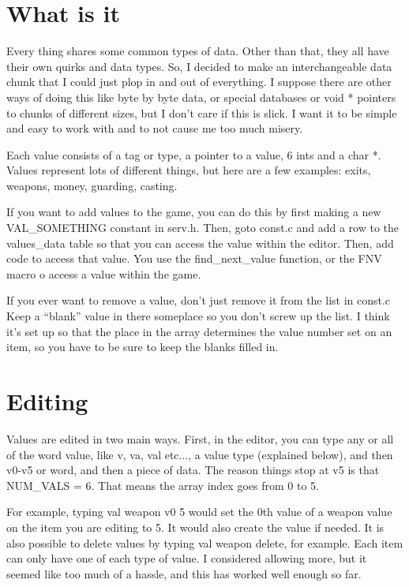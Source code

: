 \section{What is it}

Every thing shares some common types of data. Other than that, they
all have their own quirks and data types. So, I decided to make an
interchangeable data chunk that I could just plop in and out of
everything. I suppose there are other ways of doing this like byte by
byte data, or special databases or void * pointers to chunks of
different sizes, but I don't care if this is slick. I want it to be
simple and easy to work with and to not cause me too much misery.

Each value consists of a tag or type, a pointer to a value, 6 ints and
a char *. Values represent lots of different things, but here are a
few examples: exits, weapons, money, guarding, casting.

If you want to add values to the game, you can do this by first making
a new VAL\_SOMETHING constant in serv.h. Then, goto const.c and add a
row to the values\_data table so that you can access the value within
the editor. Then, add code to access that value. You use the
find\_next\_value function, or the FNV macro o access a value within
the game.

If you ever want to remove a value, don't just remove it from the list
in const.c Keep a ``blank'' value in there someplace so you don't
screw up the list. I think it's set up so that the place in the array
determines the value number set on an item, so you have to be sure to
keep the blanks filled in.


\section{Editing}

Values are edited in two main ways. First, in the editor, you can type
any or all of the word value, like v, va, val etc..., a value type
(explained below), and then v0-v5 or word, and then a piece of data.
The reason things stop at v5 is that NUM\_VALS = 6. That means the 
array index goes from 0 to 5.

For example, typing val weapon v0 5 would set the 0th value of a
weapon value on the item you are editing to 5. It would also create
the value if needed. It is also possible to delete values by typing
val weapon delete, for example. Each item can only have one of each
type of value. I considered allowing more, but it seemed like too much
of a hassle, and this has worked well enough so far.

